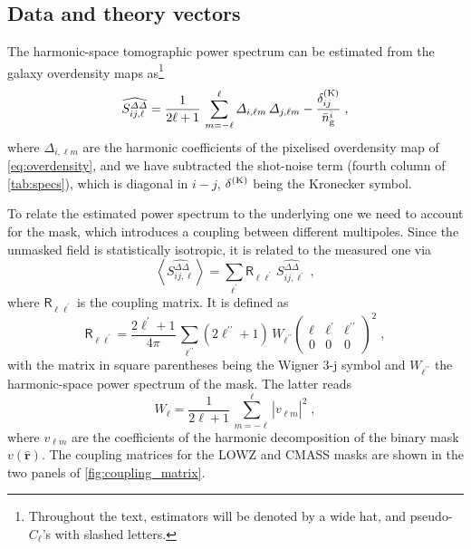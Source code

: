 \documentclass[astrosymb,twocolumn]{aastex631}
\newcommand{\de}{\mathrm{d}}
\let\Omega\varOmega
\begin{document}
\subsection{Data and theory vectors}
The harmonic-space tomographic power spectrum can be estimated from the galaxy overdensity maps as\footnote{Throughout the text, estimators will be denoted by a wide hat, and pseudo-\(C_\ell\)'s with slashed letters.}
\begin{equation}
    \widehat{S^{\varDelta\varDelta}_{ij,\ell}}=\frac{1}{2\ell+1}\,\sum_{m=-\ell}^{\ell}\varDelta_{i,\ell m}\,\varDelta_{j,\ell m}-\frac{\delta^{\rm(K)}_{ij}}{\bar n_{\rm g}^i}\;,
    \label{eq:PCL}
\end{equation}
where \(\varDelta_{i,\ell m}\) are the harmonic coefficients of the pixelised overdensity map of \autoref{eq:overdensity}, and we have subtracted the shot-noise term (fourth column of \autoref{tab:specs}), which is diagonal in \(i-j\), \(\delta^{\rm(K)}\) being the Kronecker symbol.

To relate the estimated power spectrum to the underlying one we need to account for the mask, which introduces a coupling between different multipoles. Since the unmasked field is statistically isotropic, it is related to the measured one via
\begin{equation}
\left\langle \widehat{S^{\varDelta\varDelta}_{ij,\ell}} \right\rangle = \sum_{\ell^\prime}\mathsf R_{\ell\ell^\prime}\,\widehat{S^{\varDelta\varDelta}_{ij,\ell^\prime}}\;,
    \label{eq:coupling1}
\end{equation}
where \(\mathsf R_{\ell\ell^\prime}\) is the coupling matrix. It is defined as
\begin{equation}
\mathsf R_{\ell\ell^\prime}=\frac{2\ell^\prime+1}{4\pi}\,\sum_{\ell^{\prime\prime}}(2\ell^{\prime\prime}+1)\,W_{\ell^{\prime\prime}}\begin{pmatrix}
\ell & \ell^\prime & \ell^{\prime\prime}\\
0 & 0 & 0
\end{pmatrix}^2\;,
    \label{eq:coupling2}
\end{equation}
with the matrix in square parentheses being the Wigner 3-j symbol and \(W_{\ell^{\prime\prime}}\) the harmonic-space power spectrum of the mask. The latter reads
\begin{equation}
W_{\ell}=\frac{1}{2\ell+1}\,\sum_{m=-\ell}^{\ell}\left|v_{\ell m}^{\phantom{\ast}}\right|^2\;,
    \label{eq:mask_spectra}
\end{equation}
where
\(v_{\ell m}\) are the coefficients of the harmonic decomposition of the binary mask \(v(\hat{\bm r})\). The coupling matrices for the LOWZ and CMASS masks are shown in the two panels of \autoref{fig:coupling_matrix}.
\end{document}
